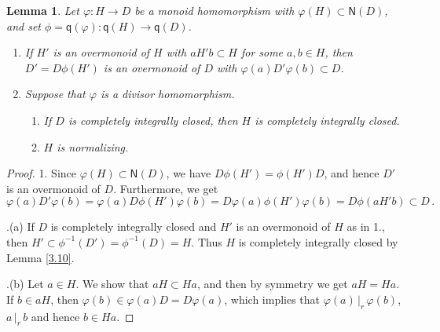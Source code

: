 \documentclass[a4paper]{amsart}
\newtheorem{lemma}[theorem]{Lemma}
\theoremstyle{definition}
\numberwithin{equation}{section}
\begin{document}
\medskip
\begin{lemma} \label{4.10}
Let  $\varphi \colon H \to D$ be a monoid homomorphism with $\varphi
(H) \subset \mathsf N (D)$, and set $\phi = \mathsf q (\varphi)
\colon \mathsf q (H) \to \mathsf q (D)$.
\begin{enumerate}
\item  If $H'$ is an overmonoid of $H$ with $aH'b \subset H$ for
       some $a, b \in H$, then $D' = D \phi (H')$ is an overmonoid of $D$
       with $\varphi (a)D' \varphi (b) \subset D$.

\smallskip
\item Suppose that $\varphi$ is a divisor homomorphism.
      \begin{enumerate}
      \smallskip
      \item If $D$ is completely integrally closed, then $H$ is
            completely integrally closed.

      \smallskip
      \item $H$ is normalizing.
      \end{enumerate}
\end{enumerate}
\end{lemma}

\begin{proof}
1. Since $\varphi (H) \subset \mathsf N (D)$, we have $D \phi (H') =
\phi (H')D$, and hence $D'$ is an overmonoid of $D$. Furthermore, we
get
\[
\varphi (a) D' \varphi (b) = \varphi (a) D \phi (H') \varphi (b) = D
\varphi (a) \phi (H') \varphi (b) = D \phi (aH'b) \subset D \,.
\]

.(a) If $D$ is completely integrally closed and $H'$ is an
overmonoid of $H$ as in 1., then $H' \subset \phi^{-1} (D') =
\phi^{-1} (D) = H$. Thus $H$ is completely integrally closed by
Lemma \ref{3.10}.

.(b) Let $a \in H$. We show that $aH \subset Ha$, and then by
symmetry we get $aH = Ha$. If $b \in aH$, then $\varphi (b) \in
\varphi (a)D = D \varphi (a)$, which implies that $\varphi (a) {\, |_r \,}
\varphi (b)$, $a {\, |_r \,} b$ and hence $b \in Ha$.
\end{proof}
\end{document}
